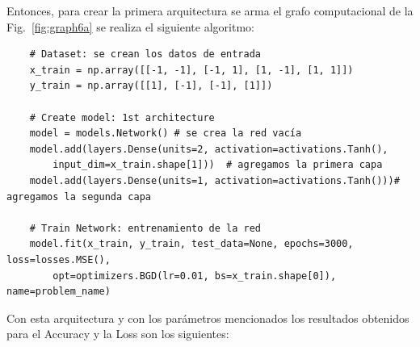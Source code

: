 Entonces, para crear la primera arquitectura se arma el grafo computacional de la Fig.~\ref{fig:graph6a} se realiza el siguiente algoritmo:

\begin{verbatim}
    # Dataset: se crean los datos de entrada
    x_train = np.array([[-1, -1], [-1, 1], [1, -1], [1, 1]])
    y_train = np.array([[1], [-1], [-1], [1]])

    # Create model: 1st architecture
    model = models.Network() # se crea la red vacía
    model.add(layers.Dense(units=2, activation=activations.Tanh(),
        input_dim=x_train.shape[1]))  # agregamos la primera capa
    model.add(layers.Dense(units=1, activation=activations.Tanh()))# agregamos la segunda capa

    # Train Network: entrenamiento de la red
    model.fit(x_train, y_train, test_data=None, epochs=3000, loss=losses.MSE(),
        opt=optimizers.BGD(lr=0.01, bs=x_train.shape[0]), name=problem_name)  
\end{verbatim}


Con esta arquitectura y con los parámetros mencionados los resultados obtenidos para el Accuracy y la Loss son los siguientes:

